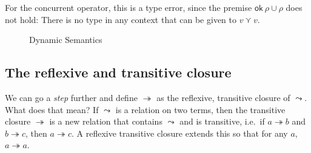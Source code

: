 For the concurrent operator, this is a type error, since the
premise $\textsf{ok} \ \rho \cup \rho$ does not hold: There is no type in any context
that can be given to $v \curlyvee v$.

\begin{figure}
  \caption{Dynamic Semantics}\label{fig:dynamicsemantics}
\end{figure}

\subsection{The reflexive and transitive closure}

We can go a \textit{step} further and define $\twoheadrightarrow$ as the reflexive,
transitive closure of $\leadsto$. What does that mean? If $\leadsto$ is a relation
on two terms, then the transitive closure $\twoheadrightarrow$ is a new relation that
contains $\leadsto$ and is transitive, i.e.\ if
$a \twoheadrightarrow b$ and $b \twoheadrightarrow c$, then
$a \twoheadrightarrow c$.  A reflexive transitive closure extends this so that for any
$a$, $a \twoheadrightarrow a$.

